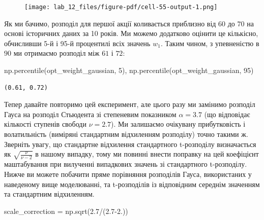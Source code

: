 \documentclass[
  letterpaper,
]{report}
\newenvironment{Shaded}{\begin{snugshade}}{\end{snugshade}}
\newcommand{\DecValTok}[1]{\textcolor[rgb]{0.68,0.00,0.00}{#1}}
\newcommand{\FloatTok}[1]{\textcolor[rgb]{0.68,0.00,0.00}{#1}}
\newcommand{\NormalTok}[1]{\textcolor[rgb]{0.00,0.23,0.31}{#1}}
\newcommand{\OperatorTok}[1]{\textcolor[rgb]{0.37,0.37,0.37}{#1}}
\begin{document}
\begin{figure}[H]

{\centering \texttt{[image: lab\_12\_files/figure-pdf/cell-55-output-1.png]}

}

\end{figure}

Як ми бачимо, розподіл для першої акції коливається приблизно від \(60%
\) до \(70%
\) на основі історичних даних за 10 років. Ми можемо додатково оцінити
це кількісно, обчисливши 5-й і 95-й процентилі всіх значень \(w_1\).
Таким чином, з упевненістю в \(90%
\) ми отримаємо розподіл між \(61%
\) і \(72%
\):

\begin{Shaded}
\begin{Highlighting}[]
\NormalTok{np.percentile(opt\_weight\_gaussian, }\DecValTok{5}\NormalTok{), np.percentile(opt\_weight\_gaussian, }\DecValTok{95}\NormalTok{)}
\end{Highlighting}
\end{Shaded}

\begin{verbatim}
(0.61, 0.72)
\end{verbatim}

Тепер давайте повторимо цей експеримент, але цього разу ми замінимо
розподіл Гауса на розподіл Стьюдента зі степеневим показником
\(\alpha=3.7\) (що відповідає кількості ступенів свободи \(\nu=2.7\)).
Ми залишаємо очікувану прибутковість і волатильність (виміряні
стандартним відхиленням розподілу) точно такими ж. Зверніть увагу, що
стандартне відхилення стандартного t-розподілу визначається як
\(\sqrt{\frac{\nu}{\nu-2}}\) в нашому випадку, тому ми повинні внести
поправку на цей коефіцієнт маштабування при вилученні випадкових значень
зі стандартного t-розподілу. Нижче ви можете побачити пряме порівняння
розподілів Гауса, використаних у наведеному вище моделюванні, та
t-розподілів із відповідним середнім значенням та стандартним
відхиленням.

\begin{Shaded}
\begin{Highlighting}[]
\NormalTok{scale\_correction }\OperatorTok{=}\NormalTok{ np.sqrt(}\FloatTok{2.7}\OperatorTok{/}\NormalTok{(}\FloatTok{2.7}\OperatorTok{{-}}\FloatTok{2.}\NormalTok{))}
\end{Highlighting}
\end{Shaded}
\end{document}
